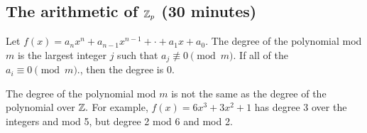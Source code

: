 \documentclass[letterpaper, 11 pt]{article}
\begin{document}
\subsection{The arithmetic of $\mathbb Z_p$ (30 minutes)}

\begin{defn}
 Let $f(x) = a_nx^n + a_{n-1}x^{n-1} + \cdot + a_1x + a_0.$ The degree of the polynomial mod $m$ is the largest
integer $j$ such that $a_j\not\equiv 0 \pmod m.$ If all of the $a_i\equiv 0 \pmod m.$, then the degree is 0.
\end{defn}

The degree of the polynomial mod $m$ is not the same as the degree of the polynomial over $\mathbb Z.$ For example,
$f(x) = 6x^3 +3x^2 + 1$ has degree 3 over the integers and mod 5, but degree 2 mod 6 and mod 2.
\end{document}
